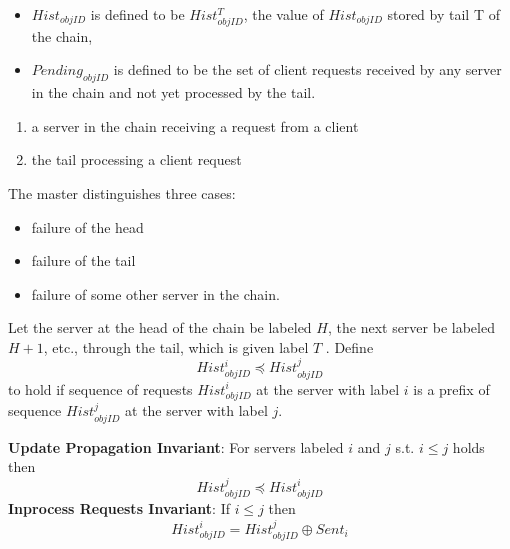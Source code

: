 \documentclass[11pt]{article}
\begin{document}
\begin{itemize}
\item \(Hist_{objID}\) is defined to be \(Hist_{objID}^T\), the value of \(Hist_{objID}\) stored by tail T of
the chain,
\item \(Pending_{objID}\) is defined to be the set of client requests received by any server in the chain and not yet processed by the tail.
\end{itemize}


\begin{enumerate}
\item a server in the chain receiving a request from a client
\item the tail processing a client request
\end{enumerate}


The master distinguishes three cases:
\begin{itemize}
\item failure of the head
\item failure of the tail
\item failure of some other server in the chain.
\end{itemize}


Let the server at the head of the chain be labeled \(H\), the next server be labeled \(H+1\), etc.,
through the tail, which is given label \(T\) . Define
\begin{equation*}
Hist_{objID}^i\preceq Hist^j_{objID}
\end{equation*}
to hold if sequence of requests \(Hist^i_{objID}\) at the server with label \(i\) is a prefix of
sequence \(Hist_{objID}^j\) at the server with label \(j\).

\textbf{Update Propagation Invariant}: For servers labeled \(i\) and \(j\) s.t. \(i\le j\) holds then
\begin{equation*}
Hist^j_{objID}\preceq Hist^i_{objID}
\end{equation*}
\textbf{Inprocess Requests Invariant}: If \(i\le j\) then
\begin{equation*}
Hist_{objID}^i=Hist^j_{objID}\oplus Sent_i
\end{equation*}
\end{document}
